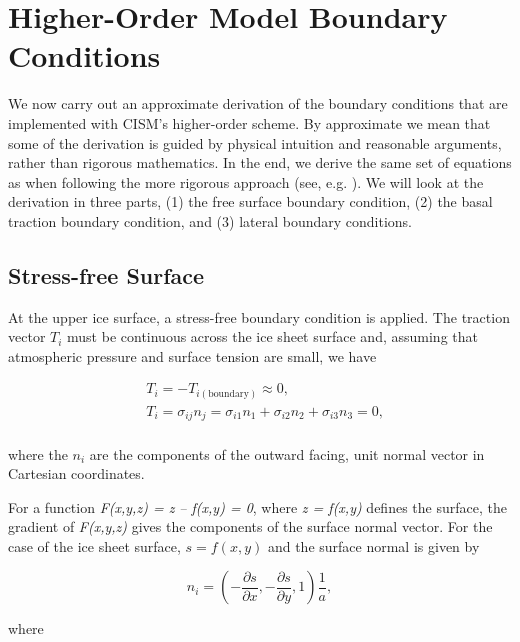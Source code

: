 
\section{Higher-Order Model Boundary Conditions}
\label{sc:higher-order-bcs}

We now carry out an approximate derivation of the boundary conditions that are implemented with CISM's higher-order scheme. By approximate we mean that some of the derivation is guided by physical intuition and reasonable arguments, rather than rigorous mathematics. In the end, we derive the same set of equations as when following the more rigorous approach (see, e.g. \citet{DUKOWICZ:2010wb}). We will look at the derivation in three parts, (1) the free surface boundary condition, (2) the basal traction boundary condition, and (3) lateral boundary conditions.

\subsection{Stress-free Surface}
At the upper ice surface, a stress-free boundary condition is applied. The traction vector $T_i$ must be continuous across the ice sheet surface and, assuming that atmospheric pressure and surface tension are small, we have

\begin{equation}
  \label{ho.eq.surface_traction}
  \begin{split}
    & T_{i} = -T_{i(\textrm{boundary})}\approx 0, \\ 
    & T_{i} = \sigma _{ij}n_{j} = \sigma _{i1}n_{1} + \sigma _{i2}n_{2} + \sigma _{i3}n_{3} = 0, \\
  \end{split}
\end{equation}

\noindent
where the $n_i$ are the components of the outward facing, unit normal vector in Cartesian coordinates.

For a function \textit{F(x,y,z) = z -- f(x,y) = 0}, where \textit{z = f(x,y)} defines the surface, the gradient of \textit{F(x,y,z)} gives the components of the surface normal vector. For the case of the ice sheet surface, $s = f(x,y)$ and the surface normal is given by

\begin{equation}
  n_{i}=\left( -\frac{\partial s}{\partial x},-\frac{\partial s}{\partial y},1 \right)\frac{1}{a},
\end{equation}

\noindent
where

